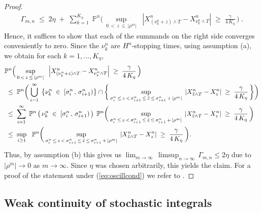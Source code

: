 \documentclass[11pt]{article}
\theoremstyle{definition}\newtheorem{example}[theorem]{Example}
\theoremstyle{definition}\newtheorem{counterexample}[theorem]{Counterexample}
\theoremstyle{definition}\newtheorem{remark}[theorem]{Remark}
\theoremstyle{definition}\newtheorem{defi}[theorem]{Definition}
\numberwithin{equation}{section}
\newcommand{\Pro}{\mathbb{P}}										%
\renewcommand{\sup}[1]{\underset{#1}{\operatorname{sup}}\;}					%
\newcommand{\union}[2]{\overset{#2}{\bigcup\limits_{#1}}\;}					%
\renewcommand{\|}{\; : \, \;}											%
\begin{document}
\begin{proof}
	\begin{align}
		\Gamma_{m,n} \; \le \; 2\eta \; + \; \sum_{k=1}^{K_\eta} \; \Pro^n \biggl( \, \sup{0\, < \, z \, \le \, |\rho^m|} \; \left| X^n_{(\nu^{n}_k+z)\wedge T} -X^n_{\nu^{n}_k \wedge T}\right| \; \ge \; \frac{\gamma}{4\, K_\eta} \,  \biggr) \; . \label{eq:equation_in_Prop_3.22}
	\end{align}
	Hence, it suffices to show that each of the summands on the right side converges conveniently to zero. Since the $\nu^{n}_k$ are $H^n$-stopping times, using assumption (a), we obtain for each $k=1,...,K_\eta$,
	\begin{align*}
		&\Pro^n \Bigl( \, \sup{0\, < \, z \, \le \, |\rho^m|} \; \left| X^n_{(\nu^{n}_k+z)\wedge T} -X^n_{\nu^{n}_k \wedge T}\right| \; \ge \; \frac{\gamma}{4\, K_\eta} \,  \Bigr) \\
		&\; \le \;\Pro^n \biggl( \,\union{i=1}{\infty}  \left\{  \nu_k^{n} \; \in \; [ \sigma_i^n \, , \, \sigma^n_{i+1} )  \right\}   \cap \biggl\{ \, \sup{\sigma^n_{i}\, \le \, z\, < \, \sigma^n_{i+1} \, \le \, \tilde{z} \, \le \, \sigma^n_{i+1} \,  + \, |\rho^m|} \left| X^n_{\tilde{z} \wedge T} -X^n_{z }\right| \; \ge \; \frac{\gamma}{4\, K_\eta}\, \biggr\}   \biggr) \\
		& \; \le \;\sum_{i=1}^\infty \; \Pro^n \left( \, \nu_k^{n} \; \in \; [ \sigma^n_i \, , \, \sigma^n_{i+1} ) \, \right ) \; \Pro^n \biggl( \, \sup{\sigma^n_{i}\, \le \, z\, < \, \sigma^n_{i+1} \, \le \, \tilde{z} \, \le \, \sigma^n_{i+1} \,  + \, |\rho^m|}  \left| X^n_{\tilde{z} \wedge T} -X^n_{z }\right| \; \ge \; \frac{\gamma}{4\, K_\eta}\,  \biggr) \\
		& \; \le \;\sup{i\ge 1} \;\;  \Pro^n \biggl( \, \sup{\sigma^n_{i}\, \le \, z\, < \, \sigma^n_{i+1} \, \le \, \tilde{z} \, \le \, \sigma^n_{i+1} \,  + \, |\rho^m|} \left| X^n_{\tilde{z} \wedge T} -X^n_{z }\right| \; \ge \; \frac{\gamma}{4\, K_\eta}\,  \biggr).
	\end{align*}
	Thus, by assumption (b) this gives us $\lim_{m \to \infty} \,\limsup_{n\to \infty} \, \Gamma_{m,n} \le 2\eta$
	due to $|\rho^m|\to 0$ as $m\to \infty$. Since $\eta$ was chosen arbitrarily, this yields the claim. For a proof of the statement under (\ref{eq:oscillcond}) we refer to \cite{jakubowski}.
\end{proof}




\subsection{Weak continuity of stochastic integrals}\label{sect:stoch_int_conv_proof}
\end{document}
